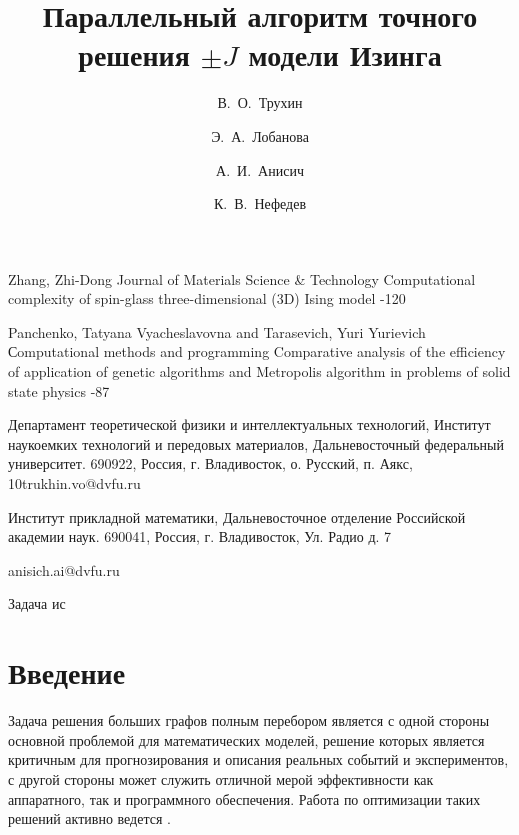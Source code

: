 \documentclass[10pt]{article}
\begin{document}
{\begin{thebibliography}{4}
			\by Zhang, Zhi-Dong
			\jour Journal of Materials Science \& Technology
			\paper Computational complexity of spin-glass three-dimensional (3D) Ising model
			-120
			
			\by Panchenko, Tatyana Vyacheslavovna and Tarasevich, Yuri Yurievich
			\jour Сomputational methods and programming
			\paper Comparative analysis of the efficiency of application of genetic algorithms and Metropolis algorithm in problems of solid state physics
			-87
			
		\end{thebibliography}
	}
	
	
	
	
	\title{Параллельный алгоритм точного решения $\pm J$ модели Изинга}
	
	\author[1,2]{В.\, О.~Трухин}{Департамент теоретической физики и интеллектуальных технологий, Институт наукоемких технологий и передовых материалов, Дальневосточный федеральный университет. 690922, Россия, г. Владивосток, о. Русский, п. Аякс, 10}{trukhin.vo@dvfu.ru}
	\author[1,2]{Э.\, А.~Лобанова}{Институт прикладной математики, Дальневосточное отделение Российской академии наук. 690041, Россия, г. Владивосток, Ул. Радио д. 7}{}
	\author[1]{А.\, И.~Анисич}{}{anisich.ai@dvfu.ru}
	\author[1,2]{К.\, В.~Нефедев}{}{}
	
	
	
	
	\makeface
	
	
	
	\abstract Задача ис
	
	
	
	\section*{Введение}
	
	Задача решения больших графов полным перебором является с одной стороны основной проблемой для математических моделей, решение которых является критичным для прогнозирования и описания реальных событий и экспериментов, с другой стороны может служить отличной мерой эффективности как аппаратного, так и программного обеспечения. Работа по оптимизации таких решений активно ведется \cite{romero2020high}. 
	
\end{document}
